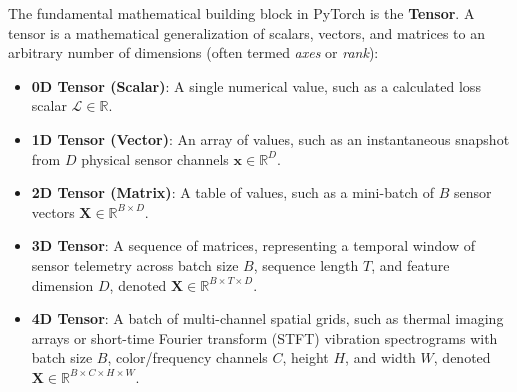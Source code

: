 The fundamental mathematical building block in PyTorch is the \textbf{Tensor}. A tensor is a mathematical generalization of scalars, vectors, and matrices to an arbitrary number of dimensions (often termed \textit{axes} or \textit{rank}):
\begin{itemize}
    \item \textbf{0D Tensor (Scalar)}: A single numerical value, such as a calculated loss scalar $\mathcal{L} \in \mathbb{R}$.
    \item \textbf{1D Tensor (Vector)}: An array of values, such as an instantaneous snapshot from $D$ physical sensor channels $\mathbf{x} \in \mathbb{R}^D$.
    \item \textbf{2D Tensor (Matrix)}: A table of values, such as a mini-batch of $B$ sensor vectors $\mathbf{X} \in \mathbb{R}^{B \times D}$.
    \item \textbf{3D Tensor}: A sequence of matrices, representing a temporal window of sensor telemetry across batch size $B$, sequence length $T$, and feature dimension $D$, denoted $\mathbf{X} \in \mathbb{R}^{B \times T \times D}$.
    \item \textbf{4D Tensor}: A batch of multi-channel spatial grids, such as thermal imaging arrays or short-time Fourier transform (STFT) vibration spectrograms with batch size $B$, color/frequency channels $C$, height $H$, and width $W$, denoted $\mathbf{X} \in \mathbb{R}^{B \times C \times H \times W}$.
\end{itemize}


